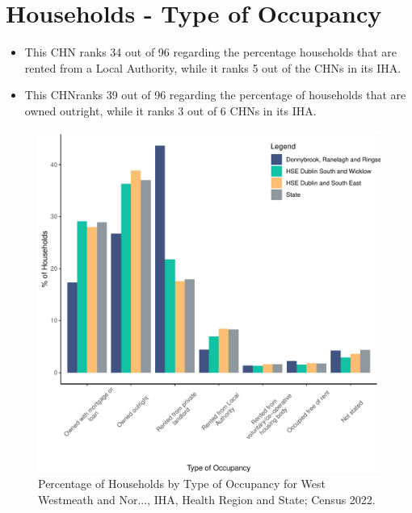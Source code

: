 \documentclass{article}
\begin{document}
\section{Households - Type of Occupancy}\label{sect:Households}
\begin{itemize}
\item This CHN ranks  34 out of 96 regarding the percentage households that are rented from a Local Authority, while it ranks  5 out of the CHNs in its IHA. 
\item This CHNranks  39 out of 96 regarding the percentage of households that are owned outright, while it ranks   3 out of 6 CHNs in its IHA.
\end{itemize}
\begin{figure}[H]
	\centering
	\includegraphics[width = 140mm]{../figures/HouseholdsED.pdf}
	\caption{Percentage of Households by Type of Occupancy for West Westmeath and Nor..., IHA, Health Region and State; Census 2022.}
	\label{fig:vbnv}
	\end{figure}
\end{document}
